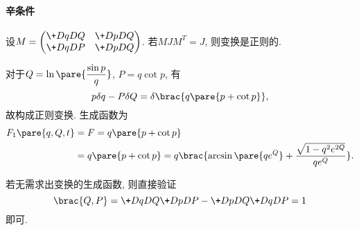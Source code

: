 \documentclass[../LectureNotes.tex]{subfiles}
\begin{document}

\paragraph{辛条件} %
\label{par:辛条件}

设$\displaystyle M = \begin{pmatrix}
    \+DqDQ & \+DpDQ \\
    \+DqDP & \+DpDQ
\end{pmatrix}$. 若$MJM^T = J$, 则变换是正则的.


\begin{sample}
    \begin{ex}
        对于$\displaystyle Q = \ln \pare{\frac{\sin p}{q}}$, $P = q\cot p$, 有
        \[ p\delta q - P\delta Q = \delta\brac{q\pare{p+\cot p}}, \]
        故构成正则变换. 生成函数为
        \begin{align*}
            F_1\pare{q,Q,t} &= F = q\pare{p+\cot p} \\
            &= q\pare{p+\cot p} = q\brac{\arcsin \pare{qe^Q} + \frac{\sqrt{1-q^2e^{2Q}}}{qe^Q}}.
        \end{align*}
    \end{ex}
    \begin{remark}
        若无需求出变换的生成函数, 则直接验证
        \[ \brac{Q,P} = \+DqDQ \+DpDP - \+DpDQ\+DqDP = 1 \]
        即可.
    \end{remark}
\end{sample}
\end{document}
